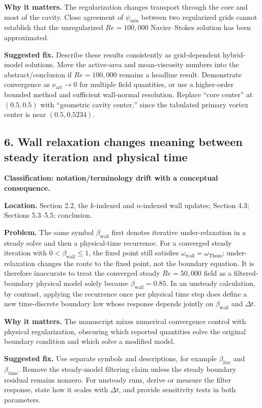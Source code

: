 \documentclass[11pt]{article}
\begin{document}
\textbf{Why it matters.} The regularization changes transport through the core and most of the cavity.  Close agreement of $\psi_{\min}$ between two regularized grids cannot establish that the unregularized $Re=100{,}000$ Navier--Stokes solution has been approximated.

\textbf{Suggested fix.} Describe these results consistently as grid-dependent hybrid-model solutions.  Move the active-area and mean-viscosity numbers into the abstract/conclusion if $Re=100{,}000$ remains a headline result.  Demonstrate convergence as $\nu_{\mathrm{art}}\to0$ for multiple field quantities, or use a higher-order bounded method and sufficient wall-normal resolution.  Replace ``core center'' at $(0.5,0.5)$ with ``geometric cavity center,'' since the tabulated primary vortex center is near $(0.5,0.5234)$.

\subsection*{6. Wall relaxation changes meaning between steady iteration and physical time}

\textbf{Classification: notation/terminology drift with a conceptual consequence.}

\textbf{Location.} Section 2.2, the $k$-indexed and $n$-indexed wall updates; Section 4.3; Sections 5.3--5.5; conclusion.

\textbf{Problem.} The same symbol $\beta_{\mathrm{wall}}$ first denotes iterative under-relaxation in a steady solve and then a physical-time recurrence.  For a converged steady iteration with $0<\beta_{\mathrm{wall}}\le1$, the fixed point still satisfies $\omega_{\mathrm{wall}}=\omega_{\mathrm{Thom}}$; under-relaxation changes the route to the fixed point, not the boundary equation.  It is therefore inaccurate to treat the converged steady $Re=50{,}000$ field as a filtered-boundary physical model solely because $\beta_{\mathrm{wall}}=0.85$.  In an unsteady calculation, by contrast, applying the recurrence once per physical time step does define a new time-discrete boundary law whose response depends jointly on $\beta_{\mathrm{wall}}$ and $\Delta t$.

\textbf{Why it matters.} The manuscript mixes numerical convergence control with physical regularization, obscuring which reported quantities solve the original boundary condition and which solve a modified model.

\textbf{Suggested fix.} Use separate symbols and descriptions, for example $\beta_{\mathrm{iter}}$ and $\beta_{\mathrm{time}}$.  Remove the steady-model filtering claim unless the steady boundary residual remains nonzero.  For unsteady runs, derive or measure the filter response, state how it scales with $\Delta t$, and provide sensitivity tests in both parameters.
\end{document}

